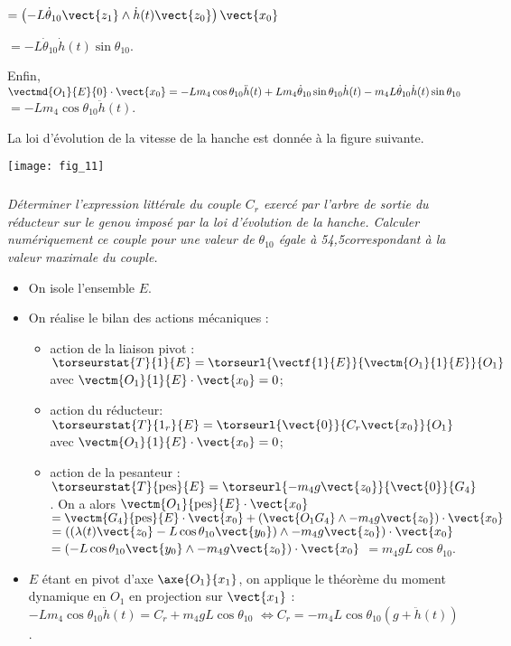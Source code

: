 \begin{multicols}{2}
\begin{corrige}
$= \left( -L\dot{\theta}_{10} \vect{z_1} \wedge\dot{h}(t)\vect{z_0}\right)\vect{x_0} $ 

$= -L\dot{\theta}_{10} \dot{h}(t) \sin \theta_{10} $. 

Enfin, 
 $\vectmd{O_1}{E}{0}\cdot\vect{x_0}=-Lm_4\cos\theta_{10}\ddot{h}(t)+Lm_4\dot{\theta}_{10}\sin\theta_{10}\dot{h}(t)-m_4L\dot{\theta}_{10} \dot{h}(t) \sin \theta_{10}$
 $=-Lm_4\cos\theta_{10}\ddot{h}(t)$.
 
\end{corrige}

\else
\fi

\ifprof
\else
La loi d'évolution de la vitesse de la hanche est donnée à la figure suivante. 

\begin{center}
\texttt{[image: fig\_11]}
\end{center}
\fi

\subparagraph{} \textit{Déterminer l’expression littérale du couple $C_r$ exercé par l’arbre de sortie du réducteur sur le genou imposé par la loi d’évolution de la hanche. Calculer numériquement ce couple pour une valeur de $\theta_{10}$ égale à
54,5\degres correspondant à la valeur maximale du couple.}

\ifprof
\begin{corrige}
\begin{itemize}
\item On isole l'ensemble $E$.
\item On réalise le bilan des actions mécaniques : 
\begin{itemize}
\item action de la liaison pivot : $\torseurstat{T}{1}{E}=\torseurl{\vectf{1}{E}}{\vectm{O_1}{1}{E}}{O_1}$ avec $\vectm{O_1}{1}{E}\cdot \vect{x_0}=0$;
\item action du réducteur: $\torseurstat{T}{1_r}{E}=\torseurl{\vect{0}}{C_r \vect{x_0}}{O_1}$ avec $\vectm{O_1}{1}{E}\cdot \vect{x_0}=0$;
\item action de la pesanteur : 
$\torseurstat{T}{\text{pes}}{E}=\torseurl{-m_4g\vect{z_0}}{\vect{0}}{G_4}$. On a alors 
$\vectm{O_1}{\text{pes}}{E}\cdot \vect{x_0}$ $=\vectm{G_4}{\text{pes}}{E}\cdot \vect{x_0}+\left(\vect{O_1G_4}\wedge -m_4g\vect{z_0} \right)\cdot \vect{x_0}$  
$=\left(\left(\lambda(t)\vect{z_0}-L\cos\theta_{10}\vect{y_0}\right)\wedge -m_4g\vect{z_0} \right)\cdot \vect{x_0}$ 
$=\left(-L\cos\theta_{10}\vect{y_0}\wedge -m_4g\vect{z_0}\right)\cdot \vect{x_0}$ $= m_4gL\cos\theta_{10}$.
\end{itemize}
\item $E$ étant en pivot d'axe $\axe{O_1}{{x_1}}$, on applique le théorème du moment dynamique en $O_1$ en projection sur $\vect{x_1}$ :
$-Lm_4\cos\theta_{10}\ddot{h}(t) =C_r +m_4gL\cos\theta_{10}$
$ \Leftrightarrow C_r=-m_4 L \cos\theta_{10} \left(g+\ddot{h}(t)\right) $. 
\end{itemize}


\end{corrige}
\end{multicols}
